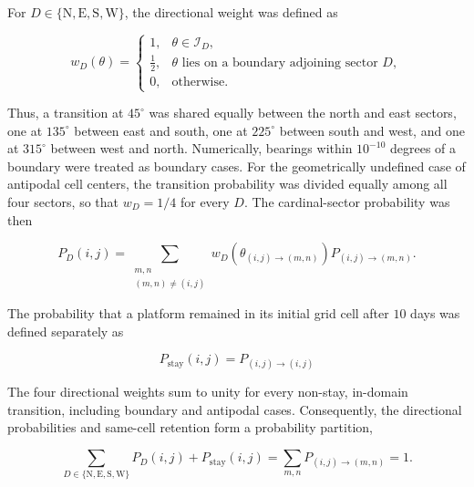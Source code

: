 \documentclass[
  draft
]{agujournal2025}
\begin{document}
            For $D\in\{\mathrm{N},\mathrm{E},\mathrm{S},\mathrm{W}\}$, the directional weight was defined as

            \begin{equation}
                w_D(\theta) =
                \begin{cases}
                    1, & \theta\in\mathcal{I}_D, \\
                    \tfrac{1}{2}, & \theta\text{ lies on a boundary adjoining sector }D, \\
                    0, & \text{otherwise}.
                \end{cases}
                \label{eq:gridded_directional_weight}
            \end{equation}

            Thus, a transition at $45^{\circ}$ was shared equally between the north and east sectors, one at $135^{\circ}$ between east and south, one at $225^{\circ}$ between south and west, and one at $315^{\circ}$ between west and north. Numerically, bearings within $10^{-10}$ degrees of a boundary were treated as boundary cases. For the geometrically undefined case of antipodal cell centers, the transition probability was divided equally among all four sectors, so that $w_D=1/4$ for every $D$. The cardinal-sector probability was then

            \begin{equation}
                P_D(i,j) =
                \sum_{\substack{m,n\\(m,n)\neq(i,j)}}
                w_D\!\left(\theta_{(i,j)\rightarrow(m,n)}\right)
                P_{(i,j)\rightarrow(m,n)}.
                \label{eq:gridded_probability_cardinal_sector}
            \end{equation}

            The probability that a platform remained in its initial grid cell after $10$ days was defined separately as

            \begin{equation}
                P_{\mathrm{stay}}(i,j) = P_{(i,j)\rightarrow(i,j)}
            \end{equation}

            The four directional weights sum to unity for every non-stay, in-domain transition, including boundary and antipodal cases. Consequently, the directional probabilities and same-cell retention form a probability partition,

            \begin{equation}
                \sum_{D\in\{\mathrm{N},\mathrm{E},\mathrm{S},\mathrm{W}\}}
                P_D(i,j) + P_{\mathrm{stay}}(i,j)
                = \sum_{m,n}P_{(i,j)\rightarrow(m,n)}
                = 1.
                \label{eq:gridded_directional_partition}
            \end{equation}
\end{document}
